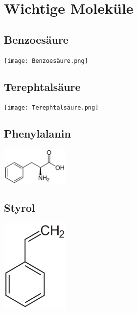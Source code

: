 \documentclass{article}
\begin{document}
\section*{Wichtige Moleküle}
\subsection*{Benzoesäure}
\texttt{[image: Benzoesäure.png]}
\subsection*{Terephtalsäure}
\texttt{[image: Terephtalsäure.png]}
\subsection*{Phenylalanin}
\includegraphics[width=0.25\textwidth]{Phenylalanin.png}
\subsection*{Styrol}
\includegraphics[width=0.25\textwidth]{Styrol.png}
\end{document}
